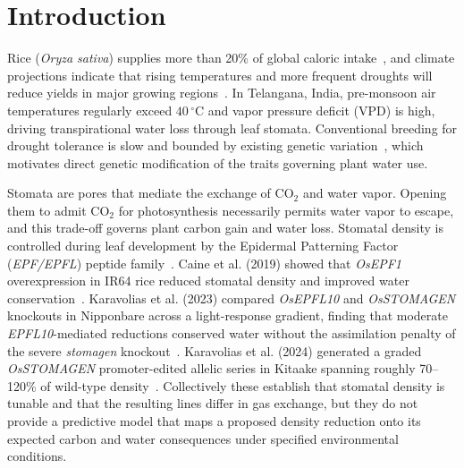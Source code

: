 \documentclass[runningheads]{llncs}
\begin{document}
\begin{abstract}
\end{abstract}
%
%
%
\section{Introduction}\label{sec:intro}

Rice (\textit{Oryza sativa}) supplies more than 20\% of global caloric intake~\cite{ref_fao}, and climate projections indicate that rising temperatures and more frequent droughts will reduce yields in major growing regions~\cite{ref_ipcc}. In Telangana, India, pre-monsoon air temperatures regularly exceed $40\,^{\circ}$C and vapor pressure deficit (VPD) is high, driving transpirational water loss through leaf stomata. Conventional breeding for drought tolerance is slow and bounded by existing genetic variation~\cite{ref_crispr_review}, which motivates direct genetic modification of the traits governing plant water use.

Stomata are pores that mediate the exchange of CO$_2$ and water vapor. Opening them to admit CO$_2$ for photosynthesis necessarily permits water vapor to escape, and this trade-off governs plant carbon gain and water loss. Stomatal density is controlled during leaf development by the Epidermal Patterning Factor (\textit{EPF/EPFL}) peptide family~\cite{ref_hepworth}. Caine et al. (2019) showed that \textit{OsEPF1} overexpression in IR64 rice reduced stomatal density and improved water conservation~\cite{ref_caine}. Karavolias et al. (2023) compared \textit{OsEPFL10} and \textit{OsSTOMAGEN} knockouts in Nipponbare across a light-response gradient, finding that moderate \textit{EPFL10}-mediated reductions conserved water without the assimilation penalty of the severe \textit{stomagen} knockout~\cite{ref_kara2023}. Karavolias et al. (2024) generated a graded \textit{OsSTOMAGEN} promoter-edited allelic series in Kitaake spanning roughly 70--120\% of wild-type density~\cite{ref_kara2024}. Collectively these establish that stomatal density is tunable and that the resulting lines differ in gas exchange, but they do not provide a predictive model that maps a proposed density reduction onto its expected carbon and water consequences under specified environmental conditions.
\end{document}

